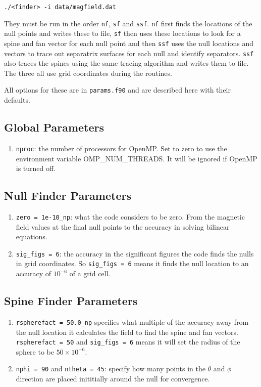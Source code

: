 \documentclass[12pt]{article}
\begin{document}
    \texttt{./<finder> -i data/magfield.dat}

    They must be run in the order \texttt{nf}, \texttt{sf} and \texttt{ssf}. \texttt{nf} first finds the locations of the null points and writes these to file, \texttt{sf} then uses these locations to look for a spine and fan vector for each null point and then \texttt{ssf} uses the null locations and vectors to trace out separatrix surfaces for each null and identify separators. \texttt{ssf} also traces the spines using the same tracing algorithm and writes them to file. The three all use grid coordinates during the routines.

    All options for these are in \texttt{params.f90} and are described here with their defaults.

    \subsection{Global Parameters}

    \begin{enumerate}
      \item \texttt{nproc}: the number of processors for OpenMP. Set to zero to use the environment variable OMP\_NUM\_THREADS. It will be ignored if OpenMP is turned off.
    \end{enumerate}

    \subsection{Null Finder Parameters}

    \begin{enumerate}
      \item \texttt{zero = 1e-10\_np}: what the code considers to be zero. From the magnetic field values at the final null points to the accuracy in solving bilinear equations.
      \item \texttt{sig\_figs = 6}: the accuracy in the significant figures the code finds the nulls in grid coordinates. So \texttt{sig\_figs = 6} means it finds the null location to an accuracy of \( 10^{-6} \) of a grid cell.
    \end{enumerate}
    
    \subsection{Spine Finder Parameters}

    \begin{enumerate}
      \item\texttt{rspherefact = 50.0\_np} specifies what multiple of the accuracy away from the null location it calculates the field to find the spine and fan vectors. \texttt{rspherefact = 50} and \texttt{sig\_figs = 6} means it will set the radius of the sphere to be \( 50 \times 10^{-6} \).
      \item \texttt{nphi = 90} and \texttt{ntheta = 45}: specify how many points in the \( \theta \) and \( \phi \) direction are placed inititially around the null for convergence.
    \end{enumerate}
\end{document}
